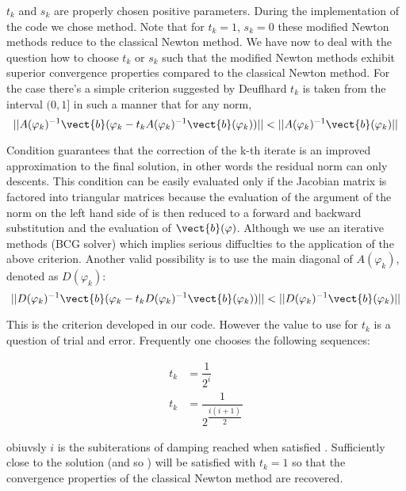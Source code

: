 $t_k$ and $s_k$ are properly chosen positive parameters. During the implementation of the code we chose  method. Note that for $t_k=1$, $s_k=0$ these modified Newton methods reduce to the classical Newton method. We have now to deal with the question how to choose $t_k$ or $s_k$ such that the modified Newton methods exhibit superior convergence properties compared to the classical Newton method.
For the case  there's a simple criterion suggested by Deuflhard \cite{selberherr:SimSem} $t_k$ is taken from the interval $(0,1]$ in such a manner that for any norm,
\begin{equation}
\label{eq: extended criterion}
||A(\varphi_k)^{-1}\vect{b}(\varphi_k-t_kA(\varphi_k)^{-1}\vect{b}(\varphi_k))||<||A(\varphi_k)^{-1}\vect{b}(\varphi_k)||
\end{equation}

Condition  guarantees that the correction of the k-th iterate is an improved approximation to the final solution, in other words the residual norm can only descents.
This condition can be easily evaluated only if the Jacobian matrix is factored into triangular matrices because the evaluation of the argument of the norm on the left hand side of  is then reduced to a forward and backward substitution and the evaluation of $\vect{b}(\varphi)$. Although we use an iterative methods (BCG solver) which implies serious diffuclties to the application of the above criterion. Another valid possibility is to use the main diagonal of $A(\varphi_k)$, denoted as $D(\varphi_k)$:
\begin{equation}
\label{eq: easy criterion}
||D(\varphi_k)^{-1}\vect{b}(\varphi_k-t_kD(\varphi_k)^{-1}\vect{b}(\varphi_k))||<||D(\varphi_k)^{-1}\vect{b}(\varphi_k)||
\end{equation}

This is the criterion developed in our code. However the value to use for $t_k$ is a question of trial and error. Frequently one chooses the following sequences:

\begin{align}
t_k & = \dfrac{1}{2^i} \\
t_k & = \dfrac{1}{2^{\dfrac{i(i+1)}{2}}}  
\end{align}

obiuvsly $i$ is the subiterations of damping reached when satisfied . Sufficiently close to the solution  (and so ) will be satisfied with $t_k=1$ so that the convergence properties of the classical Newton method are recovered.
 
